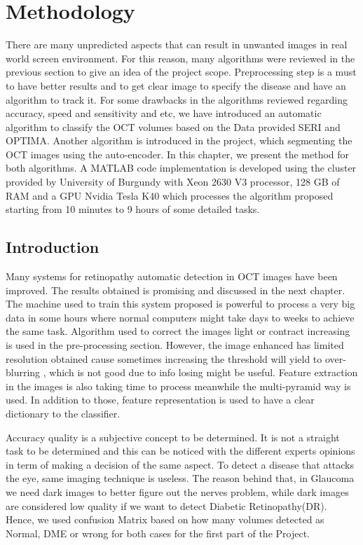 \chapter{Methodology} \label{chap:Methodology}

There are many unpredicted aspects that can result in unwanted images in real world screen environment.
For this reason, many algorithms were reviewed in the previous section to give an idea of the project scope.
Preprocessing step is a must to have better results and to get clear image to specify the disease and have an algorithm to track it.
For some drawbacks in the algorithms reviewed regarding accuracy, speed and sensitivity and etc, we have introduced an automatic algorithm to classify the OCT volumes based on the Data provided SERI and OPTIMA.
Another algorithm is introduced in the project, which segmenting the OCT images using the auto-encoder.
In this chapter, we present the method for both algorithms.
A MATLAB code implementation is developed using the cluster provided by University of Burgundy with Xeon 2630 V3 processor, 128 GB of RAM and a GPU Nvidia Tesla K40 which processes the algorithm proposed starting from 10 minutes to 9 hours of some detailed tasks.

\section{Introduction}

Many systems for retinopathy automatic detection in OCT images have been improved.
The results obtained is promising and discussed in the next chapter.
The machine used to train this system proposed is powerful to process a very big data in some hours where normal computers might take days to weeks to achieve the same task.
Algorithm used to correct the images light or contract increasing is used in the pre-processing section.
However, the image enhanced has limited resolution obtained cause sometimes increasing the threshold will yield to over-blurring , which is not good due to info losing might be useful.
Feature extraction in the images is also taking time to process meanwhile the multi-pyramid way is used.
In addition to those, feature representation is used to have a clear dictionary to the classifier.

Accuracy quality is a subjective concept to be determined.
It is not a straight task to be determined and this can be noticed with the different experts opinions  in term of making a decision of the same aspect.
To detect a disease that attacks the eye, same imaging technique is useless.
The reason behind that, in Glaucoma we need dark images to better figure out the nerves problem, while dark images are considered low quality if we want to detect Diabetic Retinopathy(DR).
Hence, we used confusion Matrix based on how many volumes detected as Normal, DME or wrong for both cases for the first part of the Project.

